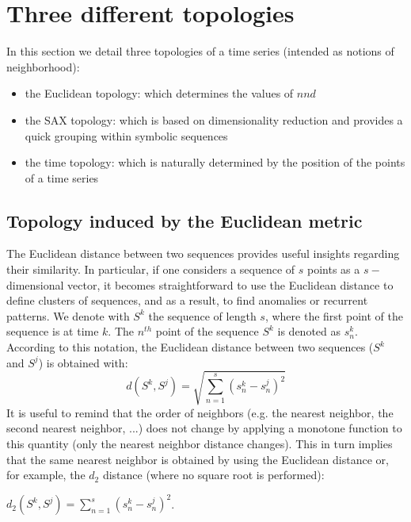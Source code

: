 \documentclass[a4paper,twoside]{article}
\begin{document}
\section{Three different topologies}\label{sec:stat}
%
In this section we detail three topologies of a time series (intended as notions of neighborhood):
%
\begin{itemize}
\item the Euclidean topology: which determines the values of $nnd$
\item the SAX topology: which is based on dimensionality reduction and provides a quick grouping within symbolic sequences   
\item the time topology: which is naturally determined by the position of the points of a time series
\end{itemize}



\subsection{Topology induced by the Euclidean metric} \label{ssec:Euclidean}
The Euclidean distance between two sequences provides useful insights regarding their similarity. In particular, if one considers a sequence of $s$ points as a $s-$dimensional vector, it becomes straightforward to use the Euclidean distance to define clusters of sequences, and as a result, to find anomalies or recurrent patterns.
%
We denote with $S^{k}$ the sequence of length $s$, where the first point of the sequence is at time $k$. The $n^{th}$ point of the sequence $S^k$ is denoted as $s^k_n$. 
According to this notation,
 the Euclidean distance between two sequences ($S^k $ and $S^j $) is obtained with: 
\begin{equation}
 d( S^k , S^j ) = \sqrt{ \sum_{n=1}^{s} \left(s^k_n-s^j_n\right)^2  } 
\end{equation}
It is useful to remind that the order of neighbors (e.g. the nearest neighbor, the second nearest neighbor, ...) does not change by applying a monotone function to this quantity (only the nearest neighbor distance changes).
%
This in turn implies that the same nearest neighbor is obtained by using the Euclidean distance or, for example, the $d_2$ distance (where no square root is performed):

$d_2({S^k},{S^j}) =  \sum_{n=1}^{s} \left(s^k_n-s^j_n\right)^2$. 
\end{document}

